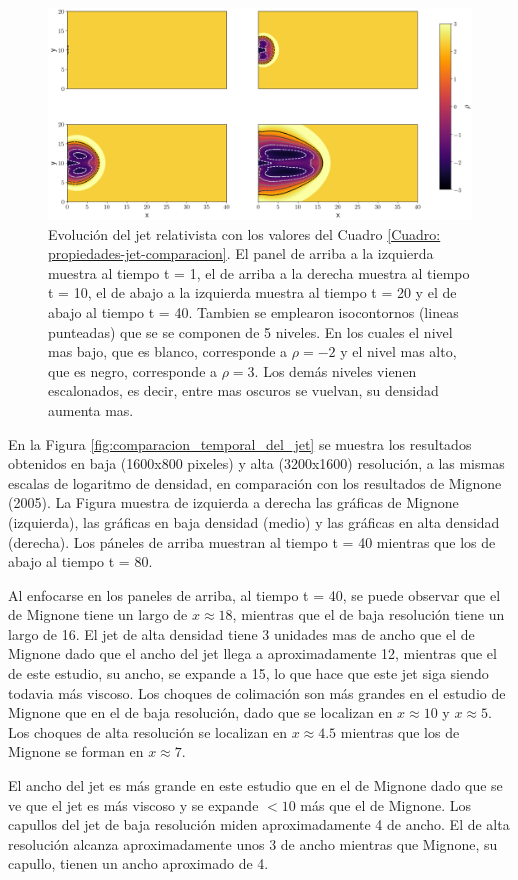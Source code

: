 \documentclass[12pt,a4paper]{book}
\begin{document}
\begin{figure}
  \centering
  \includegraphics[width=1\textwidth]{./Figuras/jet/evolucion/evolucion.png}
    \caption{Evolución del jet relativista con los valores del Cuadro 
    \ref{Cuadro: propiedades-jet-comparacion}. {\color {red} El panel de arriba a la izquierda muestra al 
    tiempo t = 1, el de arriba a la derecha muestra al tiempo t = 10, 
    el de abajo a la izquierda muestra al tiempo t = 20 y el de abajo al tiempo t = 40.
    Tambien se emplearon isocontornos (lineas punteadas) que se se componen de 5 niveles. En los 
    cuales el nivel mas bajo, que es blanco, corresponde a $\rho = -2$ y el nivel mas alto, que es negro, 
    corresponde a $\rho = 3$. Los demás niveles vienen escalonados, es decir, entre mas oscuros se vuelvan, su 
    densidad aumenta mas.}}\label{fig:evolucion_temporal_del_jet}
\end{figure}

{\color {red} En la Figura \ref{fig:comparacion_temporal_del_jet} se muestra los resultados obtenidos en baja 
(1600x800 pixeles) y alta (3200x1600) resolución, a 
las mismas escalas de logaritmo de densidad, en comparación con los resultados de Mignone (2005).
La Figura muestra de izquierda a derecha las gráficas de Mignone (izquierda), las gráficas en baja densidad (medio) 
y las gráficas en alta densidad (derecha). Los páneles de arriba muestran al tiempo t = 40 mientras que los de abajo al 
tiempo t = 80.}

{\color {red} Al enfocarse en los paneles de arriba, al tiempo t = 40, se puede observar que el de Mignone tiene un largo de 
$x \approx 18$, mientras que el de baja resolución tiene un largo de 16. El jet de alta densidad tiene 3 unidades mas de ancho 
que el de Mignone dado que el ancho del jet llega a aproximadamente 12, mientras que el de este estudio, su ancho, 
se expande a 15, lo que hace que este jet siga siendo todavia más viscoso.
Los choques de colimación son más grandes en el estudio de Mignone que en el de baja resolución, 
dado que se localizan en $x \approx 10$ y $x \approx 5$. Los choques de alta resolución se localizan en $x \approx 4.5$ mientras 
que los de Mignone se forman en $x \approx 7$.

El ancho del jet es más grande en este 
estudio que en el de Mignone dado que se ve que el jet es más viscoso y se expande $<10$ más que el de 
Mignone. 
Los capullos del jet de baja resolución miden aproximadamente 4 de ancho. El de alta resolución 
alcanza aproximadamente unos 3 de ancho mientras
que Mignone, su capullo, tienen un ancho aproximado de 4.}
\end{document}
